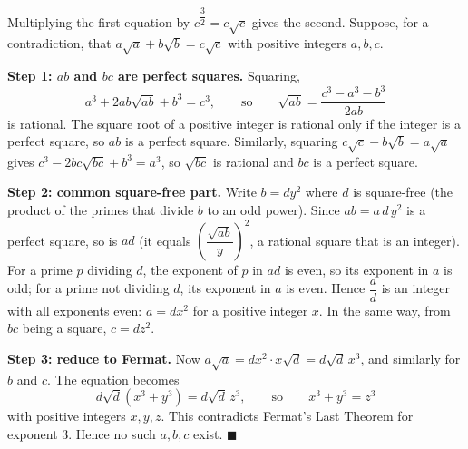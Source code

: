Multiplying the first equation by $c^{\dfrac{3}{2}}=c\sqrt c$ gives the second. Suppose, for a contradiction, that $a\sqrt a+b\sqrt b=c\sqrt c$ with positive integers $a,b,c$.

\textbf{Step 1: $ab$ and $bc$ are perfect squares.} Squaring,
\[a^3+2ab\sqrt{ab}+b^3=c^3,\qquad\text{so}\qquad\sqrt{ab}=\dfrac{c^3-a^3-b^3}{2ab}\]
is rational. The square root of a positive integer is rational only if the integer is a perfect square, so $ab$ is a perfect square. Similarly, squaring $c\sqrt c-b\sqrt b=a\sqrt a$ gives $c^3-2bc\sqrt{bc}+b^3=a^3$, so $\sqrt{bc}$ is rational and $bc$ is a perfect square.

\textbf{Step 2: common square-free part.} Write $b=dy^2$ where $d$ is square-free (the product of the primes that divide $b$ to an odd power). Since $ab=a\,d\,y^2$ is a perfect square, so is $ad$ (it equals $\left(\dfrac{\sqrt{ab}}{y}\right)^2$, a rational square that is an integer). For a prime $p$ dividing $d$, the exponent of $p$ in $ad$ is even, so its exponent in $a$ is odd; for a prime not dividing $d$, its exponent in $a$ is even. Hence $\dfrac {a}{d}$ is an integer with all exponents even: $a=dx^2$ for a positive integer $x$. In the same way, from $bc$ being a square, $c=dz^2$.

\textbf{Step 3: reduce to Fermat.} Now $a\sqrt a=dx^2\cdot x\sqrt d=d\sqrt d\,x^3$, and similarly for $b$ and $c$. The equation becomes
\[d\sqrt d\left(x^3+y^3\right)=d\sqrt d\,z^3,\qquad\text{so}\qquad x^3+y^3=z^3\]
with positive integers $x,y,z$. This contradicts Fermat's Last Theorem for exponent $3$. Hence no such $a,b,c$ exist. $\blacksquare$
